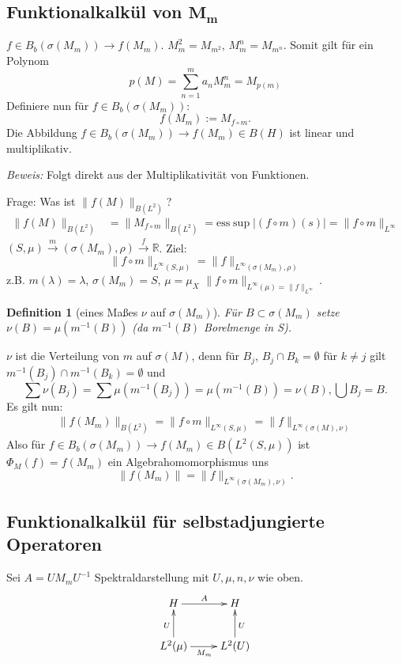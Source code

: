 \documentclass[12pt]{extreport} %
\newtheorem{Definition}[Satz]{Definition}
\numberwithin{equation}{section}
\newcommand{\R}{\mathbb{R}} %
\newcommand{\Bew}{\emph{Beweis: }}
\begin{document}
	\subsection*{Funktionalkalkül von $\mathbf{M_m}$} $f\in B_b(\sigma(M_m)) \rightarrow f(M_m)$. $M_m^2 = M_{m^2}$, $M_m^n = M_{m^n}$. Somit gilt für ein Polynom
	$$p(M) = \sum_{n = 1}^{m} a_n M_m^n = M_{p(m)}$$
	Definiere nun für $f\in B_b(\sigma(M_m))$: $$f(M_m):= M_{f\circ m}.$$
	Die Abbildung $f\in B_b(\sigma(M_m)) \rightarrow f(M_m)\in B(H)$ ist linear und multiplikativ.
	
	\Bew Folgt direkt aus der Multiplikativität von Funktionen.
	
	Frage: Was ist $\|f(M)\|_{B(L^2)}$?
	\begin{align*}
		\|f(M)\|_{B(L^2)} &= \|M_{f\circ m}\|_{B(L^2)} = \text{ess}\sup |(f\circ m)(s)| = \|f\circ m\|_{L^\infty}
	\end{align*}
	$(S,\mu)\overset{m}{\rightarrow} (\sigma(M_m),\rho)\overset{f}{\rightarrow}\R$. Ziel:
	$$\|f\circ m\|_{L^{\infty}(S,\mu)} = \|f\|_{L^\infty(\sigma(M_m),\rho)}$$
	z.B. $m(\lambda) = \lambda$, $\sigma(M_m) = S$, $\mu= \mu_X$ $\|f\circ m\|_{L^\infty(\mu) = \|f\|_{L^\infty}}$.
	
	\begin{Definition}[eines Maßes $\nu$ auf $\sigma(M_m)$]
		Für $B\subset \sigma(M_m)$ setze $\nu(B) = \mu(m^{-1}(B))$ (da $m^{-1}(B)$ Borelmenge in S).
	\end{Definition}
	
	 $\nu$ ist die Verteilung von $m$ auf $\sigma(M)$, denn für $B_j$, $B_j\cap B_k = \emptyset$ für $k\neq j$ gilt $m^{-1}(B_j)\cap m^{-1}(B_k) =\emptyset$ und 
	 $$\sum \nu(B_j) = \sum \mu(m^{-1}(B_j)) = \mu(m^{-1}(B)) = \nu(B), \bigcup B_j = B.$$
	 Es gilt nun: 
	 \begin{align*}
	 	\|f(M_m)\|_{B(L^2)} = \|f\circ m\|_{L^\infty(S,\mu)} = \|f\|_{L^\infty(\sigma(M), \nu)}
	 \end{align*}
	Also für $f\in B_b(\sigma(M_m))\rightarrow f(M_m)\in B(L^2(S,\mu))$ ist $\Phi_M(f) = f(M_m)$ ein Algebrahomomorphismus uns 
	$$\|f(M_m)\| = \|f\|_{L^\infty(\sigma(M_m),\nu)}.$$
	
	\subsection*{Funktionalkalkül für selbstadjungierte Operatoren}
	
	Sei $A = UM_m U^{-1}$ Spektraldarstellung mit $U,\mu,n,\nu$ wie oben.
	$$\xymatrix{
		H\ar[r]^A & H \\
		L^2(\mu)\ar[u]^U \ar[r]_{M_m}& L^2(U)\ar[u]_U
		}$$
	
\end{document}
